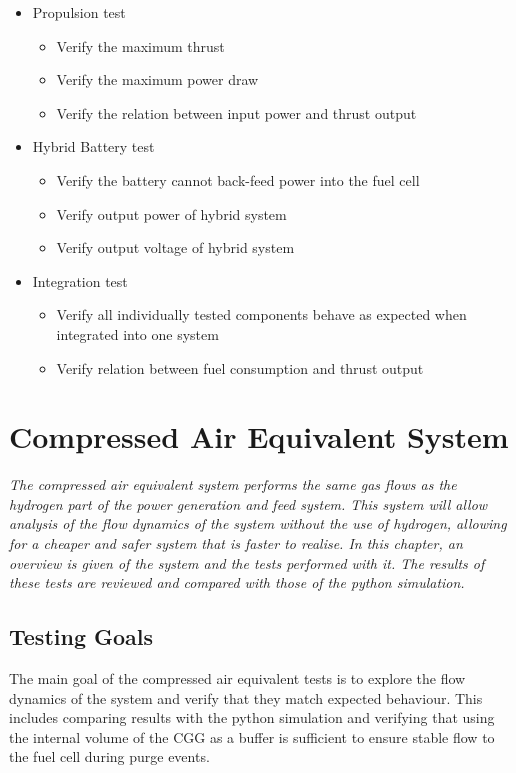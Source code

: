 \begin{itemize}
    \item Propulsion test
          \begin{itemize}
              \item Verify the maximum thrust
              \item Verify the maximum power draw
              \item Verify the relation between input power and thrust output
          \end{itemize}

    \item Hybrid Battery test
          \begin{itemize}
              \item Verify the battery cannot back-feed power into the fuel cell
              \item Verify output power of hybrid system
              \item Verify output voltage of hybrid system
          \end{itemize}

    \item Integration test
          \begin{itemize}
              \item Verify all individually tested components behave as expected when integrated into one system
              \item Verify relation between fuel consumption and thrust output
          \end{itemize}
\end{itemize}

\clearpage
\section{Compressed Air Equivalent System}

\emph{The compressed air equivalent system performs the same gas flows as the hydrogen part of the power generation and feed system. This system will allow analysis of the flow dynamics of the system without the use of hydrogen, allowing for a cheaper and safer system that is faster to realise. In this chapter, an overview is given of the system and the tests performed with it. The results of these tests are reviewed and compared with those of the python simulation.}

\subsection{Testing Goals}
The main goal of the compressed air equivalent tests is to explore the flow dynamics of the system and verify that they match expected behaviour. This includes comparing results with the python simulation and verifying that using the internal volume of the CGG as a buffer is sufficient to ensure stable flow to the fuel cell during purge events.

